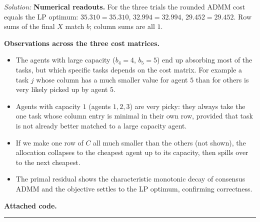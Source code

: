 \documentclass[a4paper, 11pt]{article}
\newenvironment{solution}
    {\textit{Solution:}}
    {}
\begin{document}
\begin{solution}
\textbf{Numerical readouts.} For the three trials the rounded ADMM cost equals the LP optimum: $35.310 = 35.310$, $32.994 = 32.994$, $29.452 = 29.452$. Row sums of the final $X$ match $b$; column sums are all $1$.

\textbf{Observations across the three cost matrices.}
\begin{itemize}[nosep]
    \item The agents with large capacity ($b_4 = 4$, $b_5 = 5$) end up absorbing most of the tasks, but which specific tasks depends on the cost matrix. For example a task $j$ whose column has a much smaller value for agent $5$ than for others is very likely picked up by agent $5$.
    \item Agents with capacity $1$ (agents $1, 2, 3$) are very picky: they always take the one task whose column entry is minimal in their own row, provided that task is not already better matched to a large capacity agent.
    \item If we make one row of $C$ all much smaller than the others (not shown), the allocation collapses to the cheapest agent up to its capacity, then spills over to the next cheapest.
    \item The primal residual shows the characteristic monotonic decay of consensus ADMM and the objective settles to the LP optimum, confirming correctness.
\end{itemize}

\textbf{Attached code.}


\end{solution}
\noindent\rule{7in}{2.8pt}
\end{document}
